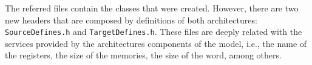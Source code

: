 The referred files contain the classes that were created. However, there are two new headers that are composed by definitions of both architectures: \texttt{SourceDefines.h} and \texttt{TargetDefines.h}. These files are deeply related with the services provided by the architectures components of the model, i.e., the name of the registers, the size of the memories, the size of the word, among others. 